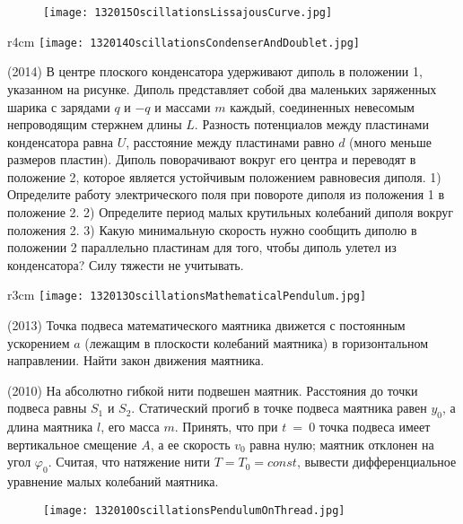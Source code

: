 \begin{figure}[!h]
\texttt{[image: 132015OscillationsLissajousCurve.jpg]}
\end{figure}

\begin{wrapfigure}{r}{4cm}
\texttt{[image: 132014OscillationsCondenserAndDoublet.jpg]}
\end{wrapfigure}

\AddProb (2014) В центре плоского конденсатора удерживают диполь в положении 1, указанном на рисунке. 
Диполь представляет собой два маленьких заряженных шарика с зарядами $q$ и $-q$ и массами $m$ каждый, 
соединенных невесомым непроводящим стержнем длины $L$. Разность потенциалов между пластинами конденсатора равна $U$, 
расстояние между пластинами равно $d$ (много меньше размеров пластин). Диполь поворачивают вокруг его центра и переводят в положение 2, 
которое является устойчивым положением равновесия диполя. 
1) Определите работу электрического поля при повороте диполя из положения 1 в положение 2. 
2) Определите период малых крутильных колебаний диполя вокруг положения 2. 
3) Какую минимальную скорость нужно сообщить диполю в положении 2 параллельно пластинам для того, чтобы диполь улетел из конденсатора? 
Силу тяжести не учитывать.

\begin{wrapfigure}{r}{3cm}
\texttt{[image: 132013OscillationsMathematicalPendulum.jpg]}
\end{wrapfigure}

\AddProb (2013) Точка подвеса математического маятника движется с постоянным ускорением $a$ (лежащим в плоскости колебаний маятника) 
в горизонтальном направлении. Найти закон движения маятника.

\AddProb (2010) На абсолютно гибкой нити подвешен маятник. Расстояния до точки подвеса равны $S_1$ и $S_2$. 
Статический прогиб в точке подвеса маятника равен $y_0$, а длина маятника $l$, его масса $m$. 
Принять, что при $t$~=~0 точка подвеса имеет вертикальное смещение $A$, а ее скорость $v_0$ равна нулю; маятник отклонен на угол $\varphi_0$. 
Считая, что натяжение нити $T = T_0 = const$, вывести дифференциальное уравнение малых колебаний маятника.

\begin{figure}[!h]
\texttt{[image: 132010OscillationsPendulumOnThread.jpg]}
\end{figure}
